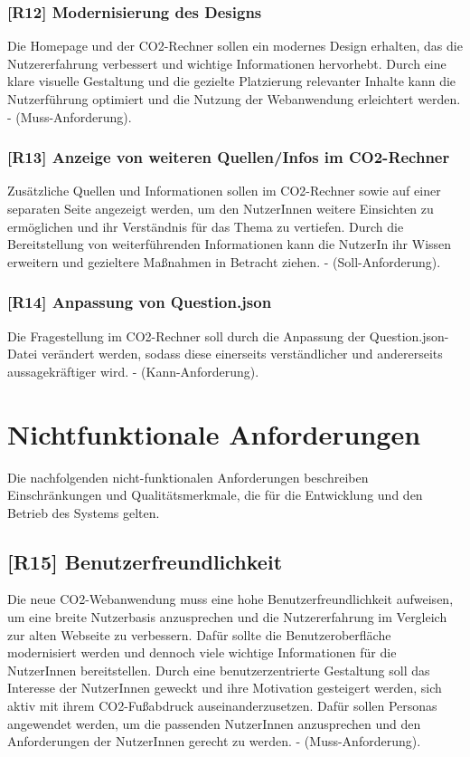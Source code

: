 \subsubsection{[R12] Modernisierung des Designs}

Die Homepage und der CO2-Rechner sollen ein modernes Design erhalten, das die Nutzererfahrung verbessert und wichtige Informationen hervorhebt. Durch eine klare visuelle Gestaltung und die gezielte Platzierung relevanter Inhalte kann die Nutzerführung optimiert und die Nutzung der Webanwendung erleichtert werden. - (Muss-Anforderung).

\subsubsection{[R13] Anzeige von weiteren Quellen/Infos im CO2-Rechner}

Zusätzliche Quellen und Informationen sollen im CO2-Rechner sowie auf einer separaten Seite angezeigt werden, um den NutzerInnen weitere Einsichten zu ermöglichen und ihr Verständnis für das Thema zu vertiefen. Durch die Bereitstellung von weiterführenden Informationen kann die NutzerIn ihr Wissen erweitern und gezieltere Maßnahmen in Betracht ziehen. - (Soll-Anforderung).

\subsubsection{[R14] Anpassung von Question.json}

Die Fragestellung im CO2-Rechner soll durch die Anpassung der Question.json-Datei verändert werden, sodass diese einerseits verständlicher und andererseits aussagekräftiger wird. - (Kann-Anforderung).

\section{Nichtfunktionale Anforderungen}
\label{chapter:5-section:nichtfunktionale-anforderungen}

Die nachfolgenden nicht-funktionalen Anforderungen beschreiben Einschränkungen und Qualitätsmerkmale, die für die Entwicklung und den Betrieb des Systems gelten.

\subsection{[R15] Benutzerfreundlichkeit}

Die neue CO2-Webanwendung muss eine hohe Benutzerfreundlichkeit aufweisen, um eine breite Nutzerbasis anzusprechen und die Nutzererfahrung im Vergleich zur alten Webseite zu verbessern. Dafür sollte die Benutzeroberfläche modernisiert werden und dennoch viele wichtige Informationen für die NutzerInnen bereitstellen. Durch eine benutzerzentrierte Gestaltung soll das Interesse der NutzerInnen geweckt und ihre Motivation gesteigert werden, sich aktiv mit ihrem CO2-Fußabdruck auseinanderzusetzen. Dafür sollen Personas angewendet werden, um die passenden NutzerInnen anzusprechen und den Anforderungen der NutzerInnen gerecht zu werden. - (Muss-Anforderung).

